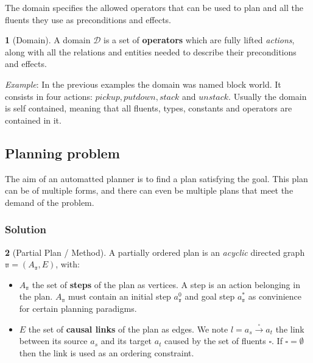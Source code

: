 \documentclass[11pt,a4paper,twoside,openright,titlepage,numbers=noenddot,headinclude,cleardoublepage=empty,openany]{scrreprt}
\theoremstyle{plain}
\theoremstyle{definition}
\newtheorem{definition}{\capitalisewords{definition}}[]
\theoremstyle{remark}
\providecommand{\tightlist}{%
  \setlength{\itemsep}{0pt}\setlength{\parskip}{0pt}}
\newcommand{\bb}{\mathbb}
\renewcommand{\cal}{\mathcal}
\begin{document}
The domain specifies the allowed operators that can be used to plan and
all the fluents they use as preconditions and effects.

\begin{definition}[Domain]

A domain \(\cal{D}\) is a set of \textbf{operators} which are fully
lifted \emph{actions}, along with all the relations and entities needed
to describe their preconditions and effects.

\end{definition}

\emph{Example}: In the previous examples the domain was named block
world. It consists in four actions: \(pickup, putdown, stack\) and
\(unstack\). Usually the domain is self contained, meaning that all
fluents, types, constants and operators are contained in it.

\hypertarget{planning-problem}{%
\subsection{Planning problem}\label{planning-problem}}

The aim of an automatted planner is to find a plan satisfying the goal.
This plan can be of multiple forms, and there can even be multiple plans
that meet the demand of the problem.

\hypertarget{solution}{%
\subsubsection{Solution}\label{solution}}

\begin{definition}[Partial Plan / Method]

A partially ordered plan is an \emph{acyclic} directed graph
\(\bb{\pi} = (A_{\bb{\pi}}, E)\), with:

\begin{itemize}
\tightlist
\item
  \(A_{\bb{\pi}}\) the set of \textbf{steps} of the plan as vertices. A
  step is an action belonging in the plan. \(A_{\bb{\pi}}\) must contain
  an initial step \(a_{\bb{\pi}}^0\) and goal step \(a_{\bb{\pi}}^*\) as
  convinience for certain planning paradigms.
\item
  \(E\) the set of \textbf{causal links} of the plan as edges. We note
  \(l = a_s \xrightarrow{\smwhtsquare} a_t\) the link between its source
  \(a_s\) and its target \(a_t\) caused by the set of fluents
  \(\smwhtsquare\). If \(\smwhtsquare = \emptyset\) then the link is
  used as an ordering constraint.
\end{itemize}

\end{definition}
\end{document}
